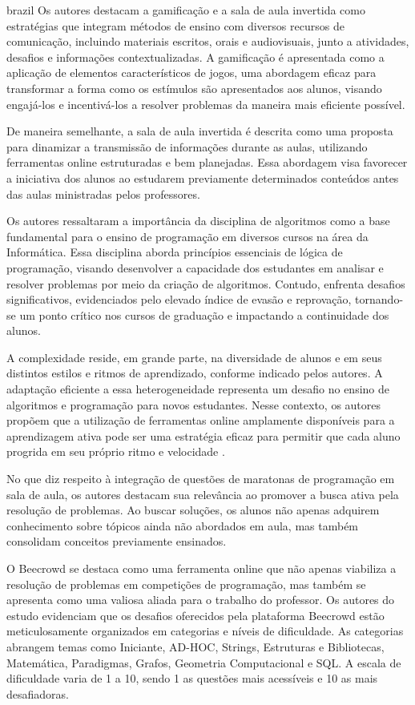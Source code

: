 \begin{otherlanguage*}{brazil}
Os autores destacam a gamificação e a sala de aula invertida como estratégias que integram métodos de ensino com diversos recursos de comunicação, incluindo materiais escritos, orais e audiovisuais, junto a atividades, desafios e informações contextualizadas. A gamificação é apresentada como a aplicação de elementos característicos de jogos, uma abordagem eficaz para transformar a forma como os estímulos são apresentados aos alunos, visando engajá-los e incentivá-los a resolver problemas da maneira mais eficiente possível. 

De maneira semelhante, a sala de aula invertida é descrita como uma proposta para dinamizar a transmissão de informações durante as aulas, utilizando ferramentas online estruturadas e bem planejadas. Essa abordagem visa favorecer a iniciativa dos alunos ao estudarem previamente determinados conteúdos antes das aulas ministradas pelos professores.

Os autores ressaltaram a importância da disciplina de algoritmos como a base fundamental para o ensino de programação em diversos cursos na área da Informática. Essa disciplina aborda princípios essenciais de lógica de programação, visando desenvolver a capacidade dos estudantes em analisar e resolver problemas por meio da criação de algoritmos. Contudo, enfrenta desafios significativos, evidenciados pelo elevado índice de evasão e reprovação, tornando-se um ponto crítico nos cursos de graduação e impactando a continuidade dos alunos. 

A complexidade reside, em grande parte, na diversidade de alunos e em seus distintos estilos e ritmos de aprendizado, conforme indicado pelos autores. A adaptação eficiente a essa heterogeneidade representa um desafio no ensino de algoritmos e programação para novos estudantes. Nesse contexto, os autores propõem que a utilização de ferramentas online amplamente disponíveis para a aprendizagem ativa pode ser uma estratégia eficaz para permitir que cada aluno progrida em seu próprio ritmo e velocidade \cite[p.~5]{cruz2022}. 

No que diz respeito à integração de questões de maratonas de programação em sala de aula, os autores destacam sua relevância ao promover a busca ativa pela resolução de problemas. Ao buscar soluções, os alunos não apenas adquirem conhecimento sobre tópicos ainda não abordados em aula, mas também consolidam conceitos previamente ensinados.

O Beecrowd se destaca como uma ferramenta online que não apenas viabiliza a resolução de problemas em competições de programação, mas também se apresenta como uma valiosa aliada para o trabalho do professor. Os autores do estudo evidenciam que os desafios oferecidos pela plataforma Beecrowd estão meticulosamente organizados em categorias e níveis de dificuldade. As categorias abrangem temas como Iniciante, AD-HOC, Strings, Estruturas e Bibliotecas, Matemática, Paradigmas, Grafos, Geometria Computacional e SQL. A escala de dificuldade varia de 1 a 10, sendo 1 as questões mais acessíveis e 10 as mais desafiadoras.


\end{otherlanguage*}
